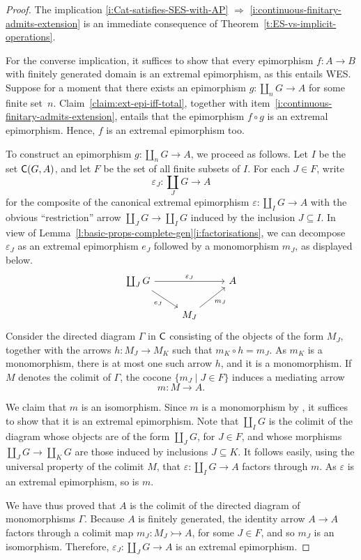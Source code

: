 \documentclass[a4paper,10pt,reqno]{amsart}
\theoremstyle{definition}
\theoremstyle{remark}
\renewcommand{\epsilon}{\varepsilon}
\newcommand{\cat}{{\sf C}}								%
\newcommand{\IMP}{\Rightarrow}						%
\newcommand{\WES}{\textnormal{WES}}
\begin{document}
\begin{proof}
The implication \ref{i:Cat-satisfies-SES-with-AP} $\IMP$ \ref{i:continuous-finitary-admits-extension} is an immediate consequence of Theorem~\ref{t:ES-vs-implicit-operations}.

For the converse implication, it suffices to show that every epimorphism $f\colon A\to B$ with finitely generated domain is an extremal epimorphism, as this entails \WES.
%
Suppose for a moment that there exists an epimorphism $g\colon \coprod_{n}G \to A$ for some finite set~$n$. Claim~\ref{claim:ext-epi-iff-total}, together with item~\ref{i:continuous-finitary-admits-extension}, entails that the epimorphism $f\circ g$ is an extremal epimorphism. Hence, $f$ is an extremal epimorphism too. 

To construct an epimorphism $g\colon \coprod_{n}G \to A$, we proceed as follows. Let $I$ be the set $\cat(G, A)$, and let $F$ be the set of all finite subsets of $I$. For each $J\in F$, write
\[
\epsilon_{J}\colon \coprod_{J}G\to A
\]
for the composite of the canonical extremal epimorphism $\epsilon \colon \coprod_{I}G \to A$ with the obvious ``restriction'' arrow $\coprod_{J}G \to \coprod_{I}G$ induced by the inclusion $J\subseteq I$. In view of Lemma~\ref{l:basic-props-complete-gen}\ref{i:factorisations}, we can decompose $\epsilon_{J}$ as an extremal epimorphism $e_{J}$ followed by a monomorphism $m_{J}$, as displayed below.
\[\begin{tikzcd}
\coprod_{J}G \arrow{rr}{\epsilon_{J}} \arrow{dr}[swap]{e_{J}} & & A \\
& M_{J} \arrow{ur}[swap]{m_{J}} & 
\end{tikzcd}\]
%
Consider the directed diagram $\Gamma$ in $\cat$ consisting of the objects of the form $M_{J}$, together with the arrows $h\colon M_{J}\to M_{K}$ such that $m_{K}\circ h = m_{J}$. As $m_{K}$ is a monomorphism, there is at most one such arrow $h$, and it is a monomorphism. If~$M$ denotes the colimit of $\Gamma$, the cocone $\{m_{J}\mid J\in F\}$ induces a mediating arrow
\[
m\colon M \to A.
\]

We claim that $m$ is an isomorphism. Since $m$ is a monomorphism by \cite[Proposition~1.62]{ar94book}, it suffices to show that it is an extremal epimorphism. Note that $\coprod_{I}G$ is the colimit of the diagram whose objects are of the form $\coprod_{J}G$, for $J\in F$, and whose morphisms $\coprod_{J}G \to \coprod_{K}G$ are those induced by inclusions $J\subseteq K$. It follows easily, using the universal property of the colimit $M$, that $\epsilon\colon \coprod_{I}G \to A$ factors through $m$. As $\epsilon$ is an extremal epimorphism, so is $m$. 

We have thus proved that $A$ is the colimit of the directed diagram of monomorphisms $\Gamma$. Because $A$ is finitely generated, the identity arrow $A\to A$ factors through a colimit map $m_{J}\colon M_{J}\rightarrowtail A$, for some $J\in F$, and so $m_{J}$ is an isomorphism. Therefore, $\epsilon_{J}\colon \coprod_{J}G\to A$ is an extremal epimorphism.
\end{proof}
\end{document}
